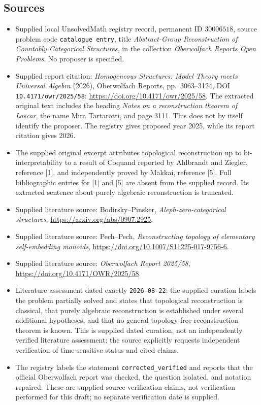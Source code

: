\documentclass[11pt]{article}
\begin{document}
\subsection{Sources}
\begin{itemize}
\item Supplied local UnsolvedMath registry record, permanent ID \(30006518\), source problem code \texttt{catalogue entry}, title \emph{Abstract-Group Reconstruction of Countably Categorical Structures}, in the collection \emph{Oberwolfach Reports Open Problems}. No proposer is specified.
\item Supplied report citation: \emph{Homogeneous Structures: Model Theory meets Universal Algebra} (2026), Oberwolfach Reports, pp.\ 3063--3124, DOI \texttt{10.4171/owr/2025/58}: \url{https://doi.org/10.4171/owr/2025/58}. The extracted original text includes the heading \emph{Notes on a reconstruction theorem of Lascar}, the name Mira Tartarotti, and page 3111. This does not by itself identify the proposer. The registry gives proposed year 2025, while its report citation gives 2026.
\item The supplied original excerpt attributes topological reconstruction up to bi-interpretability to a result of Coquand reported by Ahlbrandt and Ziegler, reference [1], and independently proved by Makkai, reference [5]. Full bibliographic entries for [1] and [5] are absent from the supplied record. Its extracted sentence about purely algebraic reconstruction is truncated.
\item Supplied literature source: Bodirsky--Pinsker, \emph{Aleph-zero-categorical structures}, \url{https://arxiv.org/abs/0907.2925}.
\item Supplied literature source: Pech--Pech, \emph{Reconstructing topology of elementary self-embedding monoids}, \url{https://doi.org/10.1007/S11225-017-9756-6}.
\item Supplied literature source: \emph{Oberwolfach Report 2025/58}, \url{https://doi.org/10.4171/OWR/2025/58}.
\item Literature assessment dated exactly \texttt{2026-08-22}: the supplied curation labels the problem partially solved and states that topological reconstruction is classical, that purely algebraic reconstruction is established under several additional hypotheses, and that no general topology-free reconstruction theorem is known. This is supplied dated curation, not an independently verified literature assessment; the source explicitly requests independent verification of time-sensitive status and cited claims.
\item The registry labels the statement \texttt{corrected\_verified} and reports that the official Oberwolfach report was checked, the question isolated, and notation repaired. These are supplied source-verification claims, not verification performed for this draft; no separate verification date is supplied.
\end{itemize}
\end{document}
